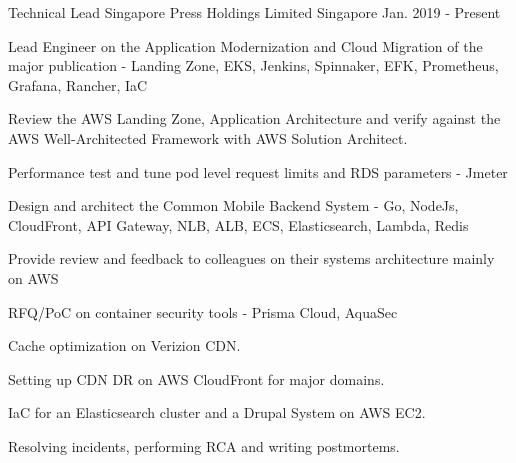 

\begin{cventries}


  \cventry
      {Technical Lead} %
      {Singapore Press Holdings Limited} %
      {Singapore} %
      {Jan. 2019 - Present} %
      { %
        \begin{cvitems}
          \item {Lead Engineer on the Application Modernization and Cloud Migration of the major publication - Landing Zone, EKS, Jenkins, Spinnaker, EFK, Prometheus, Grafana, Rancher, IaC}
          \item {Review the AWS Landing Zone, Application Architecture and verify against the AWS Well-Architected Framework with AWS Solution Architect.}\newline
          \item {Performance test and tune pod level request limits and RDS parameters - Jmeter}
          \item {Design and architect the Common Mobile Backend System - Go, NodeJs, CloudFront, API Gateway, NLB, ALB, ECS, Elasticsearch, Lambda, Redis}
          \item {Provide review and feedback to colleagues on their systems architecture mainly on AWS}
          \item {RFQ/PoC on container security tools - Prisma Cloud, AquaSec}
          \item {Cache optimization on Verizion CDN.}
          \item {Setting up CDN DR on AWS CloudFront for major domains.}
          \item {IaC for an Elasticsearch cluster and a Drupal System on AWS EC2.}
          \item {Resolving incidents, performing RCA and writing postmortems.}
        \end{cvitems}
      }



\end{cventries}
